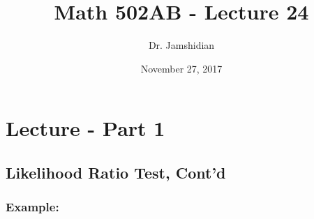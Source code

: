 \documentclass{article}
\title{Math 502AB - Lecture 24}
\author{Dr. Jamshidian}
\date{November 27, 2017}
\begin{document}
\maketitle

\section{Lecture - Part 1}

\subsection{Likelihood Ratio Test, Cont'd}

\subsubsection*{Example:}
\end{document}
